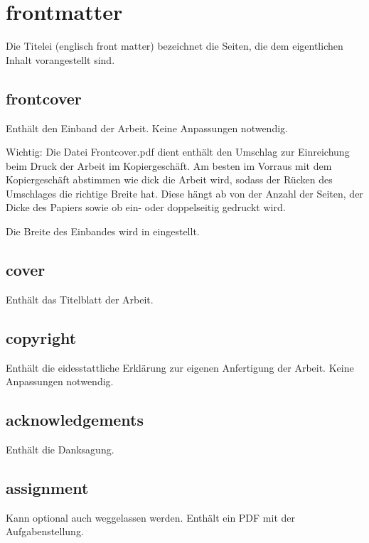 \newpage

\section*{frontmatter}

Die Titelei (englisch front matter) bezeichnet die Seiten, die dem eigentlichen Inhalt vorangestellt sind.

\subsection*{frontcover}
\label{section:_01_frontcover}

Enthält den Einband der Arbeit. Keine Anpassungen notwendig.

Wichtig: Die Datei Frontcover.pdf dient enthält den Umschlag zur Einreichung beim Druck der Arbeit im Kopiergeschäft. Am besten im Vorraus mit dem Kopiergeschäft abstimmen wie dick die Arbeit wird, sodass der Rücken des Umschlages die richtige Breite hat. Diese hängt ab von der Anzahl der Seiten, der Dicke des Papiers sowie ob ein- oder doppelseitig gedruckt wird. 

Die Breite des Einbandes wird in  eingestellt.

\subsection*{cover}

Enthält das Titelblatt der Arbeit. 

\subsection*{copyright}

Enthält die eidesstattliche Erklärung zur eigenen Anfertigung der Arbeit. Keine Anpassungen notwendig.

\subsection*{acknowledgements}

Enthält die Danksagung. 

\subsection*{assignment}

Kann optional auch weggelassen werden. Enthält ein PDF mit der Aufgabenstellung.

